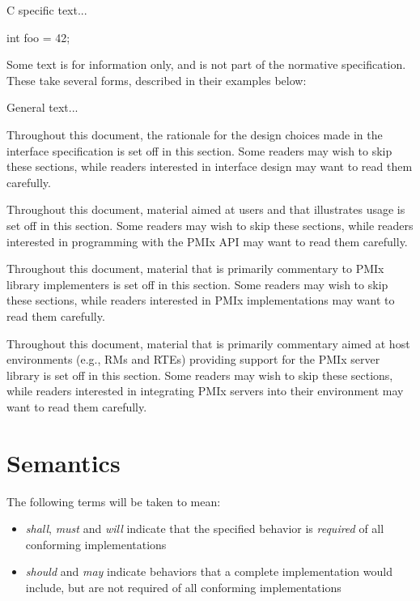 \cspecificstart
C specific text...
\begin{codepar}
int foo = 42;
\end{codepar}
\cspecificend

Some text is for information only, and is not part of the normative specification.
These take several forms, described in their examples below:

\notestart
\noteheader
General text...
\noteend

\rationalestart
Throughout this document, the rationale for the design choices made in the interface specification is set off in this section.
Some readers may wish to skip these sections, while readers interested in interface design may want to read them carefully.
\rationaleend

\adviceuserstart
Throughout this document, material aimed at users and that illustrates usage is set off in this section.
Some readers may wish to skip these sections, while readers interested in programming with the \ac{PMIx} \ac{API} may want to read them carefully.
\adviceuserend

\adviceimplstart
Throughout this document, material that is primarily commentary to \ac{PMIx} library implementers is set off in this section.
Some readers may wish to skip these sections, while readers interested in \ac{PMIx} implementations may want to read them carefully.
\adviceimplend

\advicermstart
Throughout this document, material that is primarily commentary aimed at host environments (e.g., \acp{RM} and \acp{RTE}) providing support for the \ac{PMIx} server library is set off in this section.
Some readers may wish to skip these sections, while readers interested in integrating \ac{PMIx} servers into their environment may want to read them carefully.
\advicermend

\section{Semantics}

The following terms will be taken to mean:

\begin{itemize}
\item \emph{shall}, \emph{must} and \emph{will} indicate that the specified behavior is \emph{required} of all conforming implementations
\item \emph{should} and \emph{may} indicate behaviors that a complete implementation would include, but are not required of all conforming implementations
\end{itemize}

